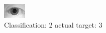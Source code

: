 \begin{figure}[h!]
\begin{center}
\includegraphics[width=0.60\columnwidth]{figures/ID1060_class_2_target_3.png}
\end{center}
\caption{ Classification: 2 actual target: 3}
\label{fig:ID1060_class_2_target_3}
\end{figure}
